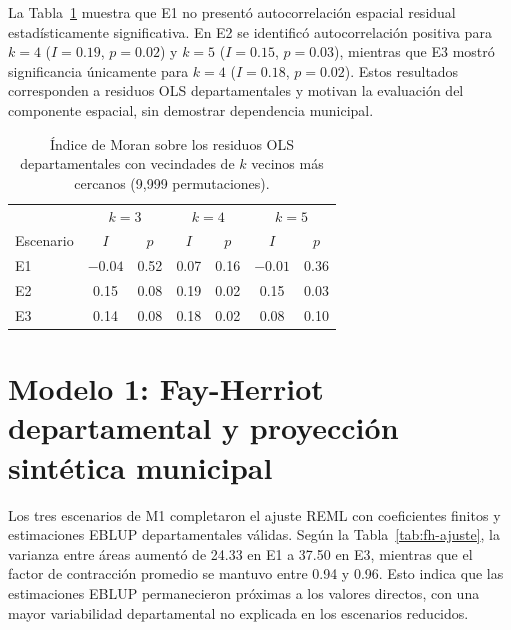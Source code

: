 La Tabla~\ref{tab:moran-exploratorio} muestra que E1 no presentó autocorrelación espacial residual estadísticamente significativa. En E2 se identificó autocorrelación positiva para $k=4$ ($I=0.19$, $p=0.02$) y $k=5$ ($I=0.15$, $p=0.03$), mientras que E3 mostró significancia únicamente para $k=4$ ($I=0.18$, $p=0.02$). Estos resultados corresponden a residuos OLS departamentales y motivan la evaluación del componente espacial, sin demostrar dependencia municipal.

\begin{table}[!htbp]
\centering
\small
\caption{Índice de Moran sobre los residuos OLS departamentales con vecindades de $k$ vecinos más cercanos (9{,}999 permutaciones).}
\label{tab:moran-exploratorio}
\renewcommand{\arraystretch}{1.2}
\begin{tabular}{l c c c c c c}
\hline
 & \multicolumn{2}{c}{$k=3$} & \multicolumn{2}{c}{$k=4$} & \multicolumn{2}{c}{$k=5$} \\
Escenario & $I$ & $p$ & $I$ & $p$ & $I$ & $p$ \\
\hline
E1 & $-0.04$ & 0.52 & 0.07 & 0.16 & $-0.01$ & 0.36 \\
E2 & 0.15 & 0.08 & 0.19 & 0.02 & 0.15 & 0.03 \\
E3 & 0.14 & 0.08 & 0.18 & 0.02 & 0.08 & 0.10 \\
\hline
\end{tabular}
\end{table}




\section{Modelo 1: Fay-Herriot departamental y proyección sintética municipal}
\label{sec:res-fh}

Los tres escenarios de M1 completaron el ajuste REML con coeficientes finitos y estimaciones EBLUP departamentales válidas. Según la Tabla~\ref{tab:fh-ajuste}, la varianza entre áreas aumentó de 24.33 en E1 a 37.50 en E3, mientras que el factor de contracción promedio se mantuvo entre 0.94 y 0.96. Esto indica que las estimaciones EBLUP permanecieron próximas a los valores directos, con una mayor variabilidad departamental no explicada en los escenarios reducidos.

